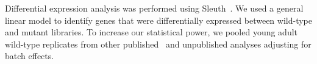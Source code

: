 \documentclass[8pt, twocolumn]{article}
\begin{document}
Differential expression analysis was performed using
Sleuth~\cite{Pimentel2016a}. We used a general linear model to identify genes
that were differentially expressed between wild-type and mutant libraries. To
increase our statistical power, we pooled young adult wild-type replicates from
other published~\cite{AngelesAlboresHIF,Angeles-Albores2017} and unpublished
analyses adjusting for batch effects.

\end{document}
